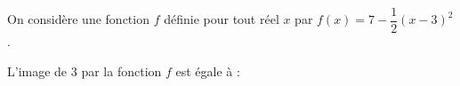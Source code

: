 
On considère une fonction $f$ définie pour tout réel $x$ par $f(x)=7-\dfrac{1}{2}(x-3)^2$.

L'image de $3$ par la fonction $f$ est égale à :

\smallskip

